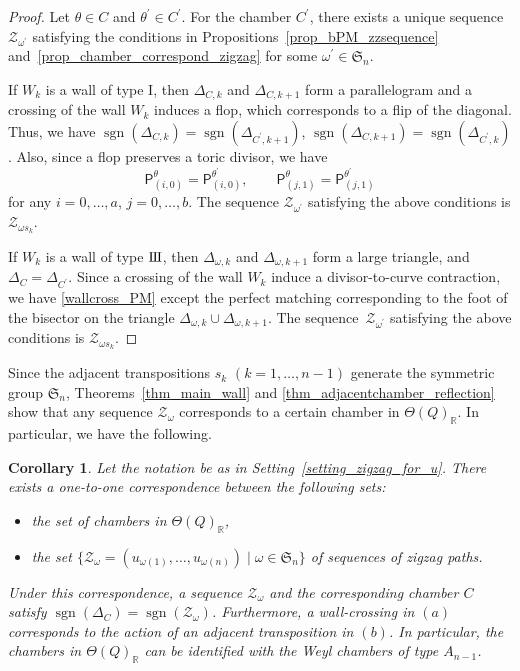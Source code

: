 \documentclass[10pt,a4paper]{amsart}
\numberwithin{equation}{section}
\newtheorem{Corollary}[Theorem]{Corollary}
\theoremstyle{definition}
\newcommand{\RR}{\mathbb{R}}
\newcommand{\calZ}{\mathcal{Z}}
\newcommand{\fkS}{\mathfrak{S}}
\newcommand{\sfP}{\mathsf{P}}
\newcommand{\sgn}{\operatorname{sgn}}
\newcommand{\typeIII}{{\rm I\hspace{-0.7pt}I\hspace{-0.7pt}I}}
\newcommand{\permII}{\omega}
\begin{document}
\begin{proof}
Let $\theta\in C$ and $\theta^\prime\in C^\prime$.
For the chamber $C^\prime$, there exists a unique sequence $\calZ_{\permII^\prime}$
satisfying the conditions in Propositions~\ref{prop_bPM_zzsequence} and~\ref{prop_chamber_correspond_zigzag} for some $\permII^\prime\in\fkS_n$.

If $W_k$ is a wall of type I, then $\Delta_{C,k}$ and $\Delta_{C,k+1}$ form a parallelogram and a crossing of the wall $W_k$ induces a flop, which corresponds to a flip of the diagonal.
Thus, we have $\sgn(\Delta_{C,k})=\sgn(\Delta_{C^\prime,k+1})$, $\sgn(\Delta_{C,k+1})=\sgn(\Delta_{C^\prime,k})$.
Also, since a flop preserves a toric divisor, we have
\begin{equation}\label{wallcross_PM}
\sfP^\theta_{(i,0)}=\sfP^{\theta^\prime}_{(i,0)}, \qquad \sfP^\theta_{(j,1)}=\sfP^{\theta^\prime}_{(j,1)}
\end{equation}
for any $i=0, \dots, a$, $j=0, \dots, b$.
The sequence $\calZ_{\permII^\prime}$ satisfying the above conditions is $\calZ_{\permII s_k}$.

If $W_k$ is a wall of type $\typeIII$, then $\Delta_{\permII,k}$ and $\Delta_{\permII,k+1}$ form a large triangle, and $\Delta_C=\Delta_{C^\prime}$.
Since a crossing of the wall $W_k$ induce a divisor-to-curve contraction, we have \eqref{wallcross_PM}
except the perfect matching corresponding to the foot of the bisector on the triangle $\Delta_{\permII,k}\cup\Delta_{\permII,k+1}$.
The sequence~$\calZ_{\permII^\prime}$ satisfying the above conditions is $\calZ_{\permII s_k}$.
\end{proof}

Since the adjacent transpositions $s_k$ $(k=1, \dots, n-1)$ generate the symmetric group $\fkS_n$,
Theorems~\ref{thm_main_wall} and \ref{thm_adjacentchamber_reflection} show that any sequence $\calZ_\permII$ corresponds to a certain chamber in $\Theta(Q)_\RR$.
In particular, we have the following.

\begin{Corollary}
\label{cor_chamber_zigzag_correspondence}
Let the notation be as in Setting~{\rm \ref{setting_zigzag_for_u}}.
There exists a one-to-one correspondence between the following sets:
\begin{itemize}\itemsep=0pt
\item[$(a)$] the set of chambers in $\Theta(Q)_\RR$,
\item[$(b)$] the set $\big\{\calZ_\permII=(u_{\permII(1)}, \dots, u_{\permII(n)}) \mid \permII\in\fkS_n\big\}$ of sequences of zigzag paths.
\end{itemize}
Under this correspondence, a sequence $\calZ_\permII$ and the corresponding chamber $C$ satisfy $\sgn(\Delta_C)=\sgn(\calZ_\permII)$.
Furthermore, a wall-crossing in $(a)$ corresponds to the action of an adjacent transposition in $(b)$.
In particular, the chambers in $\Theta(Q)_\RR$ can be identified with the Weyl chambers of type $A_{n-1}$.
\end{Corollary}
\end{document}
